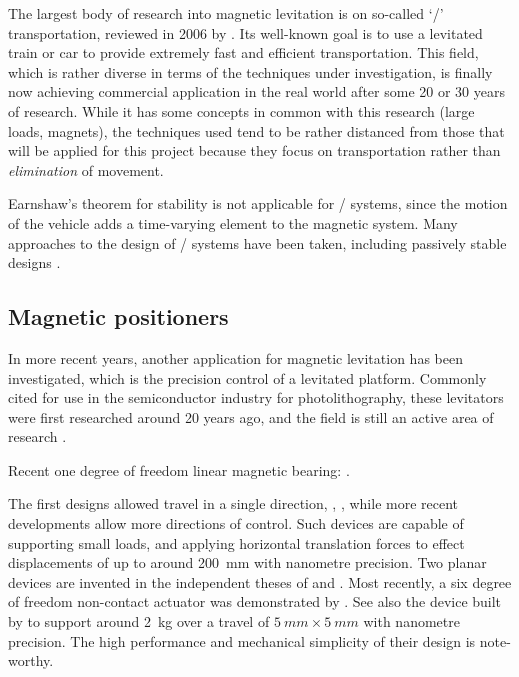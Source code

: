 The largest body of research into magnetic levitation is on so-called `\maglev/'
transportation, reviewed in 2006 by \textcite{lee2006}.
Its well-known goal is to use a levitated train or car to provide extremely fast and efficient transportation.
This field, which is rather diverse in terms of the techniques under investigation, is finally now achieving commercial application in the real world after some 20 or 30 years
of research.
While it has some concepts in common with this research (large loads, magnets), the techniques used tend to be rather distanced from those that will be applied for this project because they focus on transportation rather than \emph{elimination} of movement.

Earnshaw's theorem for stability is not applicable for \maglev/ systems, since the motion of the vehicle adds a time-varying element to the magnetic system.
Many approaches to the design of \maglev/ systems have been taken, including passively stable designs \cite{musolino2009}.


\subsection{Magnetic positioners}

In more recent years, another application for magnetic levitation has been investigated, which is the precision control of a levitated platform.
Commonly cited for use in the semiconductor industry for photolithography, these levitators were first researched around 20 years ago, and the field is still an active area of research \cite{fulford2008,fulford2009}.

Recent one degree of freedom linear magnetic bearing: \cite{ro2009-preeng}.

The first designs allowed travel in a single direction, \eg, \textcite{trumper1992}, while more recent developments allow more directions of control.
Such devices are capable of supporting small loads, and applying horizontal translation forces to effect displacements of up to around \SI{200}{mm} with nanometre precision.
Two planar devices are invented in the independent theses of \textcite{kim1997} and \textcite{molenaar2000}.
Most recently, a six degree of freedom non-contact actuator was demonstrated by \textcite{verma2004}.
See also the device built by \textcite{kim2007} to support around \SI{2}{kg} over a travel of $\SI{5}{mm}\times\SI{5}{mm}$ with nanometre precision.
The high performance and mechanical simplicity of their design is note-worthy.

